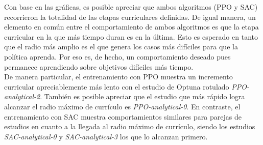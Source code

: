 Con base en las gráficas, es posible apreciar que ambos algoritmos (PPO y SAC) recorrieron la totalidad de las etapas curriculares definidas. De igual manera, un elemento en común entre el comportamiento de ambos algoritmos es que la etapa curricular en la que más tiempo duran es en la última. Esto es esperado en tanto que el radio más amplio es el que genera los casos más difíciles para que la política aprenda. Por eso es, de hecho, un comportamiento deseado pues permanece aprendiendo sobre objetivos difíciles más tiempo.\\

De manera particular, el entrenamiento con PPO muestra un incremento curricular apreciablemente más lento con el estudio de Optuna rotulado \emph{PPO-analytical-2}. También es posible apreciar que el estudio que más rápido logra alcanzar el radio máximo de currículo es \emph{PPO-analytical-0}. En contraste, el entrenamiento con SAC muestra comportamientos similares para parejas de estudios en cuanto a la llegada al radio máximo de currículo, siendo los estudios \emph{SAC-analytical-0} y \emph{SAC-analytical-3} los que lo alcanzan primero.\\

